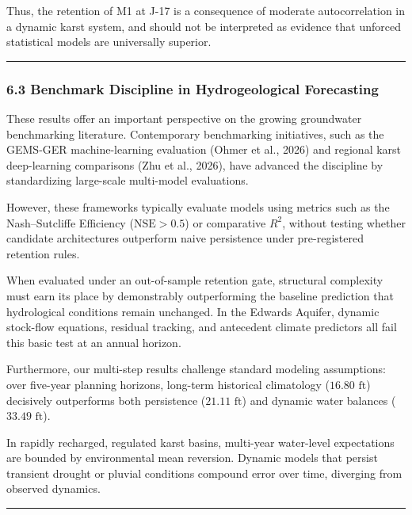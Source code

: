 \documentclass[11pt]{article}
\begin{document}
Thus, the retention of M1 at J-17 is a consequence of moderate
autocorrelation in a dynamic karst system, and should not be interpreted
as evidence that unforced statistical models are universally superior.

\begin{center}\rule{0.5\linewidth}{0.5pt}\end{center}

\subsubsection{6.3 Benchmark Discipline in Hydrogeological
Forecasting}\label{benchmark-discipline-in-hydrogeological-forecasting}

These results offer an important perspective on the growing groundwater
benchmarking literature. Contemporary benchmarking initiatives, such as
the GEMS-GER machine-learning evaluation (Ohmer et al., 2026) and
regional karst deep-learning comparisons (Zhu et al., 2026), have
advanced the discipline by standardizing large-scale multi-model
evaluations.

However, these frameworks typically evaluate models using metrics such
as the Nash--Sutcliffe Efficiency (\(\mathrm{NSE} > 0.5\)) or
comparative \(R^2\), without testing whether candidate architectures
outperform naive persistence under pre-registered retention rules.

When evaluated under an out-of-sample retention gate, structural
complexity must earn its place by demonstrably outperforming the
baseline prediction that hydrological conditions remain unchanged. In
the Edwards Aquifer, dynamic stock-flow equations, residual tracking,
and antecedent climate predictors all fail this basic test at an annual
horizon.

Furthermore, our multi-step results challenge standard modeling
assumptions: over five-year planning horizons, long-term historical
climatology (\(16.80\text{ ft}\)) decisively outperforms both
persistence (\(21.11\text{ ft}\)) and dynamic water balances
(\(33.49\text{ ft}\)).

In rapidly recharged, regulated karst basins, multi-year water-level
expectations are bounded by environmental mean reversion. Dynamic models
that persist transient drought or pluvial conditions compound error over
time, diverging from observed dynamics.

\begin{center}\rule{0.5\linewidth}{0.5pt}\end{center}
\end{document}
